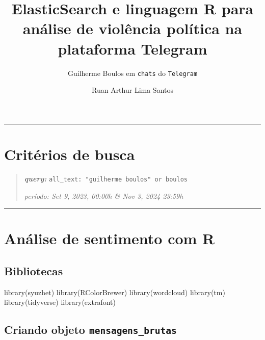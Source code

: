 \documentclass[
  12pt,
]{report}
\title{ElasticSearch e linguagem R para análise de violência política na
plataforma Telegram}
\subtitle{Guilherme Boulos em \texttt{chats} do \texttt{Telegram}}
\author{Ruan Arthur Lima Santos}
\date{}
\newenvironment{Shaded}{\begin{snugshade}}{\end{snugshade}}
\newcommand{\FunctionTok}[1]{\textcolor[rgb]{0.28,0.35,0.67}{#1}}
\newcommand{\NormalTok}[1]{\textcolor[rgb]{0.00,0.23,0.31}{#1}}
\renewcommand*\contentsname{Índice}
\newcommand\contentsname{Índice}
\begin{document}
\maketitle

\renewcommand*\contentsname{Índice}
{
\hypersetup{linkcolor=}
\setcounter{tocdepth}{2}
\tableofcontents
}

\begin{center}\rule{0.5\linewidth}{0.5pt}\end{center}

\chapter{Critérios de busca}\label{crituxe9rios-de-busca}

\begin{quote}
\textbf{\emph{query:}}
\texttt{all\_text:\ "guilherme\ boulos"\ or\ boulos}

\emph{período: Set 9, 2023, 00:00h \& Nov 3, 2024 23:59h}
\end{quote}

\begin{center}\rule{0.5\linewidth}{0.5pt}\end{center}

\chapter{Análise de sentimento com
R}\label{anuxe1lise-de-sentimento-com-r}

\section{Bibliotecas}\label{bibliotecas}

\begin{Shaded}
\begin{Highlighting}[]
\FunctionTok{library}\NormalTok{(syuzhet)}
\FunctionTok{library}\NormalTok{(RColorBrewer)}
\FunctionTok{library}\NormalTok{(wordcloud)}
\FunctionTok{library}\NormalTok{(tm)}
\FunctionTok{library}\NormalTok{(tidyverse)}
\FunctionTok{library}\NormalTok{(extrafont)}
\end{Highlighting}
\end{Shaded}

\section{\texorpdfstring{Criando objeto
\texttt{mensagens\_brutas}}{Criando objeto mensagens\_brutas}}\label{criando-objeto-mensagens_brutas}
\end{document}
